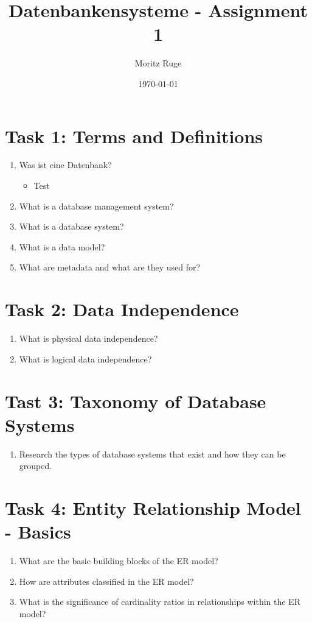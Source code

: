 \documentclass[10pt,a4paper]{article}
\title{Datenbankensysteme - Assignment 1}
\author{Moritz Ruge}
\date{\today} %
\begin{document}
\maketitle  %



\section*{Task 1: Terms and Definitions}
\begin{enumerate}
	\item Was ist eine Datenbank?
	
	\begin{itemize}
		\item Test
	\end{itemize}
	
	\item What is a database management system?
	
	\item What is a database system?
	
	\item What is a data model?
	
	\item What are metadata and what are they used for?
\end{enumerate}


\section*{Task 2: Data Independence}
\begin{enumerate}
\item What is physical data independence?

\item What is logical data independence?
\end{enumerate}

\section*{Tast 3: Taxonomy of Database Systems}
\begin{enumerate}
\item Research the types of database systems that exist and how they can be grouped.
\end{enumerate}


\section*{Task 4: Entity Relationship Model - Basics}
\begin{enumerate}
\item What are the basic building blocks of the ER model?

\item How are attributes classified in the ER model?

\item What is the significance of cardinality ratios in relationships within the ER model?
\end{enumerate}
\end{document}
